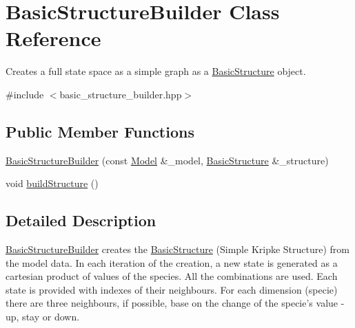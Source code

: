 \hypertarget{classBasicStructureBuilder}{\section{\-Basic\-Structure\-Builder \-Class \-Reference}
\label{classBasicStructureBuilder}
}


\-Creates a full state space as a simple graph as a \hyperlink{classBasicStructure}{\-Basic\-Structure} object.  




{\ttfamily \#include $<$basic\-\_\-structure\-\_\-builder.\-hpp$>$}

\subsection*{\-Public \-Member \-Functions}
\begin{DoxyCompactItemize}
\item 
\hyperlink{classBasicStructureBuilder_ab5143ea3bfccc2afa3f348a0bb2cb3fe}{\-Basic\-Structure\-Builder} (const \hyperlink{classModel}{\-Model} \&\-\_\-model, \hyperlink{classBasicStructure}{\-Basic\-Structure} \&\-\_\-structure)
\item 
void \hyperlink{classBasicStructureBuilder_a71a0c391b82ca2d4fd3bac50a8589823}{build\-Structure} ()
\end{DoxyCompactItemize}


\subsection{\-Detailed \-Description}
\hyperlink{classBasicStructureBuilder}{\-Basic\-Structure\-Builder} creates the \hyperlink{classBasicStructure}{\-Basic\-Structure} (\-Simple \-Kripke \-Structure) from the model data. \-In each iteration of the creation, a new state is generated as a cartesian product of values of the species. \-All the combinations are used. \-Each state is provided with indexes of their neighbours. \-For each dimension (specie) there are three neighbours, if possible, base on the change of the specie's value -\/ up, stay or down. 

